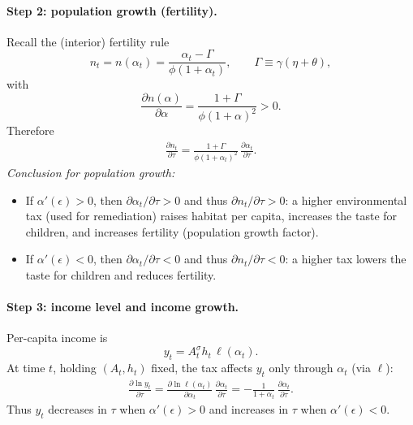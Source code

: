 \documentclass[11pt]{article}
\begin{document}
\paragraph{Step 2: population growth (fertility).}
Recall the (interior) fertility rule
\[
n_t=n(\alpha_t)=\frac{\alpha_t-\Gamma}{\phi(1+\alpha_t)},
\qquad
\Gamma\equiv \gamma(\eta+\theta),
\]
with
\[
\frac{\partial n(\alpha)}{\partial \alpha}=\frac{1+\Gamma}{\phi(1+\alpha)^2}>0.
\]
Therefore
\begin{align}
\frac{\partial n_t}{\partial \tau}
=
\frac{1+\Gamma}{\phi(1+\alpha_t)^2}\,
\frac{\partial \alpha_t}{\partial \tau}.
\label{eq:dn_dtau}
\end{align}
\emph{Conclusion for population growth:}
\begin{itemize}
\item If $\alpha'(\epsilon)>0$, then $\partial \alpha_t/\partial\tau>0$ and thus $\partial n_t/\partial\tau>0$:
a higher environmental tax (used for remediation) raises habitat per capita, increases the taste for children, and increases fertility (population growth factor).
\item If $\alpha'(\epsilon)<0$, then $\partial \alpha_t/\partial\tau<0$ and thus $\partial n_t/\partial\tau<0$:
a higher tax lowers the taste for children and reduces fertility.
\end{itemize}

\paragraph{Step 3: income level and income growth.}
Per-capita income is
\[
y_t=A_t^\sigma h_t\,\ell(\alpha_t).
\]
At time $t$, holding $(A_t,h_t)$ fixed, the tax affects $y_t$ only through $\alpha_t$ (via $\ell$):
\begin{align}
\frac{\partial \ln y_t}{\partial \tau}
=
\frac{\partial \ln \ell(\alpha_t)}{\partial \alpha_t}\,\frac{\partial \alpha_t}{\partial \tau}
=
-\frac{1}{1+\alpha_t}\,\frac{\partial \alpha_t}{\partial \tau}.
\label{eq:dlny_dtau}
\end{align}
Thus $y_t$ decreases in $\tau$ when $\alpha'(\epsilon)>0$ and increases in $\tau$ when $\alpha'(\epsilon)<0$.
\end{document}
